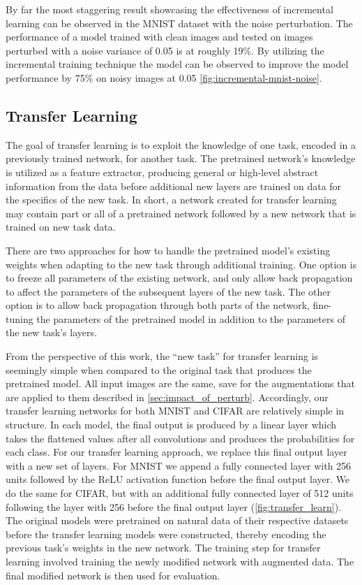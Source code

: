 \documentclass[conference]{IEEEtran}
\begin{document}
By far the most staggering result showcasing the effectiveness of incremental learning can be observed in the MNIST dataset with the noise perturbation. The performance of a model trained with clean images and tested on images perturbed with a noise variance of 0.05 is at roughly 19\%. By utilizing the incremental training technique the model can be observed to improve the model performance by 75\% on noisy images at 0.05 \autoref{fig:incremental-mnist-noise}.

\subsection{Transfer Learning}

The goal of transfer learning is to exploit the knowledge of one task, encoded in a previously trained network, for another task. The pretrained network's knowledge is utilized as a feature extractor, producing general or high-level abstract information from the data before additional new layers are trained on data for the specifics of the new task. In short, a network created for transfer learning may contain part or all of a pretrained network followed by a new network that is trained on new task data.

There are two approaches for how to handle the pretrained model's existing weights when adapting to the new task through additional training. One option is to freeze all parameters of the existing network, and only allow back propagation to affect the parameters of the subsequent layers of the new task. The other option is to allow back propagation through both parts of the network, fine-tuning the parameters of the pretrained model in addition to the parameters of the new task’s layers.

From the perspective of this work, the “new task” for transfer learning is seemingly simple when compared to the original task that produces the pretrained model. All input images are the same, save for the augmentations that are applied to them described in \autoref{sec:impact_of_perturb}. Accordingly, our transfer learning networks for both MNIST and CIFAR are relatively simple in structure. In each model, the final output is produced by a linear layer which takes the flattened values after all convolutions and produces the probabilities for each class. For our transfer learning approach, we replace this final output layer with a new set of layers. For MNIST we append a fully connected layer with 256 units followed by the ReLU activation function before the final output layer. We do the same for CIFAR, but with an additional fully connected layer of 512 units following the layer with 256 before the final output layer (\autoref{fig:transfer_learn}). The original models were pretrained on natural data of their respective datasets before the transfer learning models were constructed, thereby encoding the previous task’s weights in the new network. The training step for transfer learning involved training the newly modified network with augmented data. The final modified network is then used for evaluation.
\end{document}
